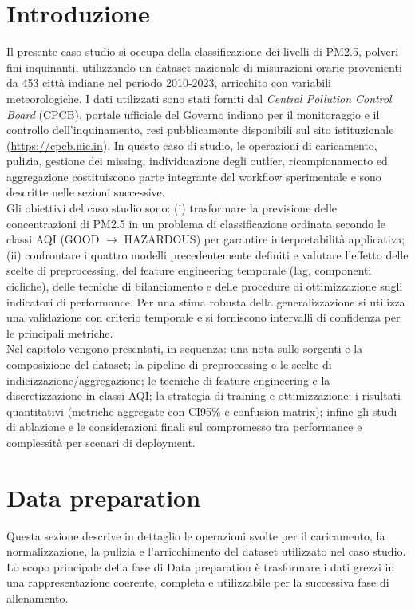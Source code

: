 \documentclass[a4paper,12pt]{report}
\begin{document}
	\section{Introduzione}
	Il presente caso studio si occupa della classificazione dei livelli di PM2.5, polveri fini inquinanti, utilizzando un dataset nazionale di misurazioni orarie provenienti da 453 città indiane nel periodo 2010-2023, arricchito con variabili meteorologiche. I dati utilizzati sono stati forniti dal \textit{Central Pollution Control Board} (CPCB), portale ufficiale del Governo indiano per il monitoraggio e il controllo dell’inquinamento, resi pubblicamente disponibili sul sito istituzionale (\url{https://cpcb.nic.in}). In questo caso di studio, le operazioni di caricamento, pulizia, gestione dei missing, individuazione degli outlier, ricampionamento ed aggregazione costituiscono parte integrante del workflow sperimentale e sono descritte nelle sezioni successive. \\
	Gli obiettivi del caso studio sono: (i) trasformare la previsione delle concentrazioni di PM2.5 in un problema di classificazione ordinata secondo le classi AQI (GOOD $\rightarrow$ HAZARDOUS) per garantire interpretabilità applicativa; (ii) confrontare i quattro modelli precedentemente definiti e valutare l’effetto delle scelte di preprocessing, del feature engineering temporale (lag, componenti cicliche), delle tecniche di bilanciamento e delle procedure di ottimizzazione sugli indicatori di performance. Per una stima robusta della generalizzazione si utilizza una validazione con criterio temporale e si forniscono intervalli di confidenza per le principali metriche. \\
	Nel capitolo vengono presentati, in sequenza: una nota sulle sorgenti e la composizione del dataset; la pipeline di preprocessing e le scelte di indicizzazione/aggregazione; le tecniche di feature engineering e la discretizzazione in classi AQI; la strategia di training e ottimizzazione; i risultati quantitativi (metriche aggregate con CI95\% e confusion matrix); infine gli studi di ablazione e le considerazioni finali sul compromesso tra performance e complessità per scenari di deployment.
	
	\section{Data preparation}
	
	Questa sezione descrive in dettaglio le operazioni svolte per il caricamento, la normalizzazione, la pulizia e l'arricchimento del dataset utilizzato nel caso studio. Lo scopo principale della fase di Data preparation è trasformare i dati grezzi in una rappresentazione coerente, completa e utilizzabile per la successiva fase di allenamento.
	
\end{document}
